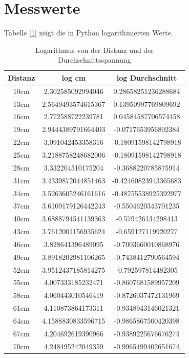 \documentclass[12pt, oneside, a4paper, \docLanguage]{report}
\begin{document}
\section{Messwerte}
\label{chap:VERSUCH_2_MESSWERTE}
Tabelle [\ref{chap:VERSUCH_2_MESSWERTE}] zeigt die in Python logarithmierten Werte.
\begin{table}[H]
	\centering\small
	\begin{tabular}{|c|c|c|}
		\hline
		Distanz & log cm & log Durchschnitt \\
		\hline
		10cm & 2.302585092994046 & 0.28658251236288684 \\
		\hline
		13cm & 2.5649493574615367 & 0.13950997769809692 \\
		\hline
		16cm & 2.772588722239781 & 0.04584587706574458 \\
		\hline
		19cm & 2.9444389791664403 & -0.0717653956802384 \\
		\hline
		22cm & 3.091042453358316 & -0.18091598142798918 \\
		\hline
		25cm & 3.2188758248682006 & -0.18091598142798918 \\
		\hline
		28cm & 3.332204510175204 & -0.3688220785875914 \\
		\hline
		31cm & 3.4339872044851463 & -0.42460823943365683 \\
		\hline
		34cm & 3.5263605246161616 & -0.48755538925392977 \\
		\hline
		37cm & 3.6109179126442243 & -0.5504620343701235 \\
		\hline
		40cm & 3.6888794541139363 & -0.579426134298413 \\
		\hline
		43cm & 3.7612001156935624 & -0.659127119920277 \\
		\hline
		46cm & 3.828641396489095 & -0.7003660010868976 \\
		\hline
		49cm & 3.8918202981106265 & -0.7438412790564594 \\
		\hline
		52cm & 3.9512437185814275 & -0.792597814482305 \\
		\hline
		55cm & 4.007333185232471 & -0.8607681589957209 \\
		\hline
		58cm & 4.060443010546419 & -0.8726037472131969 \\
		\hline
		61cm & 4.110873864173311 & -0.9348943146021321 \\
		\hline
		64cm & 4.1588830833596715 & -0.9865867500420398 \\
		\hline
		67cm & 4.204692619390966 & -0.9389225676676274 \\
		\hline
		70cm & 4.248495242049359 & -0.9965499402651674 \\
		\hline
	\end{tabular}
	\caption{Logarithmus von der Distanz und der Durchschnittsspannung}
	\label{fig:VERSUCH_2_LOGARITHMUS_TABELLE}
\end{table}
\newpage
\end{document}
